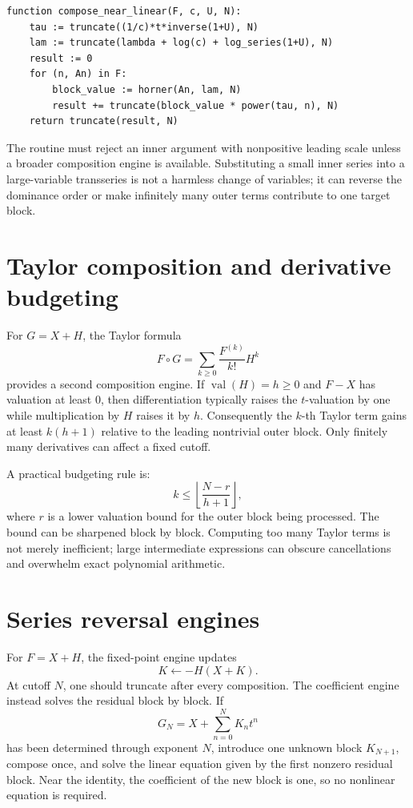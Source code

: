 \documentclass[11pt,openany]{book}
\theoremstyle{definition}
\theoremstyle{plain}
\theoremstyle{remark}
\DeclareMathOperator{\val}{val}
\begin{document}
\begin{lstlisting}[style=pseudo,caption={Near-linear composition through a power cutoff}]
function compose_near_linear(F, c, U, N):
    tau := truncate((1/c)*t*inverse(1+U), N)
    lam := truncate(lambda + log(c) + log_series(1+U), N)
    result := 0
    for (n, An) in F:
        block_value := horner(An, lam, N)
        result += truncate(block_value * power(tau, n), N)
    return truncate(result, N)
\end{lstlisting}

The routine must reject an inner argument with nonpositive leading scale unless a broader composition engine is available. Substituting a small inner series into a large-variable transseries is not a harmless change of variables; it can reverse the dominance order or make infinitely many outer terms contribute to one target block.

\section{Taylor composition and derivative budgeting}
For \(G=X+H\), the Taylor formula
\[
 F\circ G=\sum_{k\ge0}\frac{F^{(k)}}{k!}H^k
\]
provides a second composition engine. If \(\val(H)=h\ge0\) and \(F-X\) has valuation at least \(0\), then differentiation typically raises the \(t\)-valuation by one while multiplication by \(H\) raises it by \(h\). Consequently the \(k\)-th Taylor term gains at least \(k(h+1)\) relative to the leading nontrivial outer block. Only finitely many derivatives can affect a fixed cutoff.

A practical budgeting rule is:
\begin{equation}\label{eq:Taylor-budget}
 k\le \left\lfloor\frac{N-r}{h+1}\right\rfloor,
\end{equation}
where \(r\) is a lower valuation bound for the outer block being processed. The bound can be sharpened block by block. Computing too many Taylor terms is not merely inefficient; large intermediate expressions can obscure cancellations and overwhelm exact polynomial arithmetic.

\section{Series reversal engines}
For \(F=X+H\), the fixed-point engine updates
\begin{equation}\label{eq:implementation-fixedpoint}
 K\leftarrow-H(X+K).
\end{equation}
At cutoff \(N\), one should truncate after every composition. The coefficient engine instead solves the residual block by block. If
\[
 G_N=X+\sum_{n=0}^{N}K_nt^n
\]
has been determined through exponent \(N\), introduce one unknown block \(K_{N+1}\), compose once, and solve the linear equation given by the first nonzero residual block. Near the identity, the coefficient of the new block is one, so no nonlinear equation is required.
\end{document}
